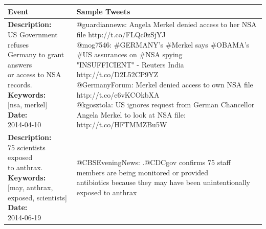 \documentclass[10pt,letterpaper]{article}
\begin{document}
\begin{table}
  \centering
  {\scriptsize
    \begin{tabular*}{1\linewidth}{p{5cm}p{5cm}}
      \hline
      Event & Sample Tweets \\
      \midrule
      \pbox{20cm}{\textbf{Description:}\\US Government refuses\\ Germany to grant answers\\ or access to NSA records. \vspace{.1cm}\\
        \textbf{Keywords:}\\ {[}nsa, merkel{]}\vspace{.1cm}\\
        \textbf{Date:}\\ 2014-04-10}
      & \pbox{20cm}{
        @guardiannews: Angela Merkel denied access to her NSA file http://t.co/FLQc0zSjYJ\vspace{.1cm}\\
        @mog7546: \#GERMANY's \#Merkel says \#OBAMA's \#US assurances on \#NSA spying\\ "INSUFFICIENT" - Reuters India http://t.co/D2L52CP9YZ\vspace{.1cm}\\
        @GermanyForum: Merkel denied access to own NSA file http://t.co/e6vKCOkbXA\vspace{.1cm}\\
        @kgosztola: US ignores request from German Chancellor Angela Merkel to look at NSA file:\\ http://t.co/HFTMMZBu5W
      }
      \\
      \hline
      \pbox{20cm}{\textbf{Description:}\\75 scientists exposed\\ to anthrax. \vspace{.1cm}\\
        \textbf{Keywords:}\\ {[}may, anthrax, \\exposed, scientists{]}\vspace{.1cm}\\
        \textbf{Date:}\\ 2014-06-19}
      & \pbox{20cm}{
        @CBSEveningNews: .@CDCgov confirms 75 staff members are being monitored or provided\\ antibiotics because they may have been unintentionally exposed to anthrax\vspace{.1cm}\\
}
\end{tabular*}}
\end{table}
\end{document}
